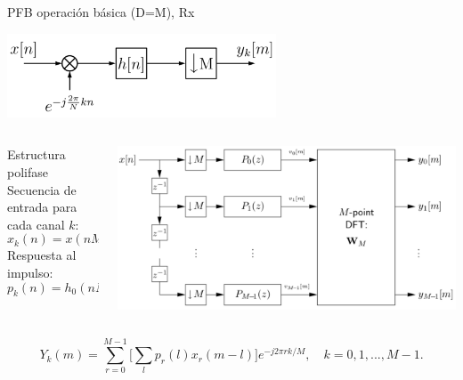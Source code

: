 \documentclass[ignorenonframetext,12pt]{beamer}
\begin{document}
\begin{frame}{PFB operación básica (D=M), Rx}
				\begin{center}
								\includegraphics[width=0.6\textwidth]{PFB_basic_operation}
				\end{center}
				\begin{columns}
								\begin{column}{0.5\textwidth}{{\color{olive}Estructura polifase}}
												\footnotesize{
																\\Secuencia de entrada para cada canal $k$:
																\begin{equation*}\label{eq:xk_decimated}
																				x_k(n) = x(nM + k), \quad k = 0,1,..., M-1
																\end{equation*}
																Respuesta al impulso:
												\begin{equation*}\label{eq:pk_filter}
																p_k(n) = h_0(nM - k), \quad k = 0,1, ...,M-1
												\end{equation*}}
								\end{column}
								\begin{column}{0.5\textwidth}{}

												\includegraphics[width=1.1\textwidth]{uniform_PFB}
								\end{column}
				\end{columns}
								\alert{\begin{equation*}\label{eq:fft_out}
												Y_k(m) = \sum_{r=0}^{M-1}\Big[ \sum_l p_r(l) x_r(m-l)\Big] e^{-j2\pi
												rk/M}, \quad k = 0,1,...,M-1.
								\end{equation*}}

\end{frame}
\end{document}
